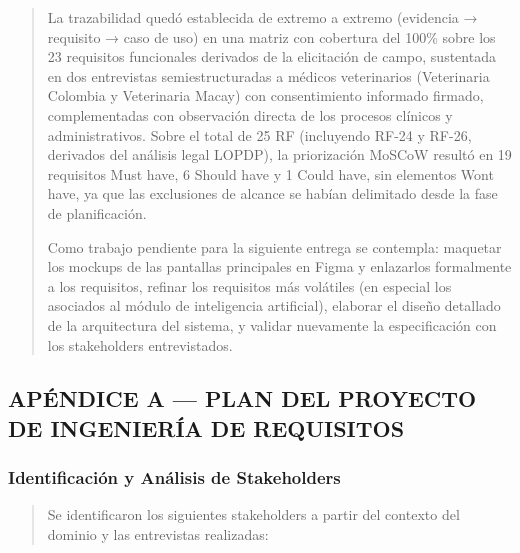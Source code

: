 \documentclass[
]{article}
\begin{document}
\begin{quote}
La trazabilidad quedó establecida de extremo a extremo (evidencia →
requisito → caso de uso) en una matriz con cobertura del 100\% sobre los
23 requisitos funcionales derivados de la elicitación de campo,
sustentada en dos entrevistas semiestructuradas a médicos veterinarios
(Veterinaria Colombia y Veterinaria Macay) con consentimiento informado
firmado, complementadas con observación directa de los procesos
clínicos y administrativos. Sobre el total de 25 RF (incluyendo RF-24 y
RF-26, derivados del análisis legal LOPDP), la priorización MoSCoW
resultó en 19 requisitos Must have, 6 Should have y 1 Could have, sin
elementos Won\textquotesingle t have, ya que las exclusiones de alcance
se habían delimitado desde la fase de planificación.

Como trabajo pendiente para la siguiente entrega se contempla: maquetar
los mockups de las pantallas principales en Figma y enlazarlos
formalmente a los requisitos, refinar los requisitos más volátiles (en
especial los asociados al módulo de inteligencia artificial), elaborar
el diseño detallado de la arquitectura del sistema, y validar nuevamente
la especificación con los stakeholders entrevistados.
\end{quote}

\subsection{APÉNDICE A --- PLAN DEL PROYECTO DE INGENIERÍA DE
REQUISITOS}\label{apuxe9ndice-a-plan-del-proyecto-de-ingenieruxeda-de-requisitos}

\subsubsection{Identificación y Análisis de
Stakeholders}\label{identificaciuxf3n-y-anuxe1lisis-de-stakeholders}

\begin{quote}
Se identificaron los siguientes stakeholders a partir del contexto del
dominio y las entrevistas realizadas:
\end{quote}
\end{document}
